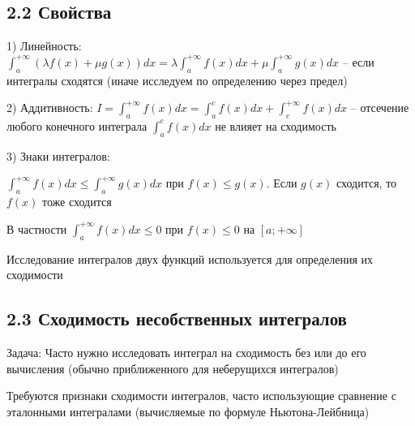 \documentclass[12pt]{article}
\begin{document}
    \subsection{2.2 Свойства}
    \hypertarget{improperintegralproperties}{}

    1) Линейность: $\displaystyle \int^{+\infty}_{a} (\lambda f(x) + \mu g(x)) dx = \lambda \int^{+\infty}_{a} f(x) dx + \mu \int^{+\infty}_{a} g(x) dx$
        -- если интегралы сходятся (иначе исследуем по определению через предел)

    2) Аддитивность: $\displaystyle I = \int^{+\infty}_{a} f(x) dx = \int^{c}_{a} f(x) dx + \int^{+\infty}_{c} f(x) dx$
        -- отсечение любого конечного интеграла $\int^{c}_{a} f(x) dx$ не влияет на сходимость

    3) Знаки интегралов:

    $\displaystyle \int^{+\infty}_{a} f(x) dx \leq \int^{+\infty}_{a} g(x) dx $ при $f(x) \leq g(x)$. Если $g(x)$ сходится, то $f(x)$ тоже сходится

    В частности $\displaystyle \int^{+\infty}_{a} f(x) dx \leq 0$ при $f(x) \leq 0$ на $[a; +\infty]$

    \Nota Исследование интегралов двух функций используется для определения их сходимости


    \subsection{2.3 Сходимость несобственных интегралов}
    \hypertarget{improperintegralconvergence}{}

    Задача: Часто нужно исследовать интеграл на сходимость без или до его вычисления (обычно приближенного для неберущихся интегралов)

    Требуются признаки сходимости интегралов, часто использующие сравнение с эталонными интегралами (вычисляемые по формуле Ньютона-Лейбница)
\end{document}

